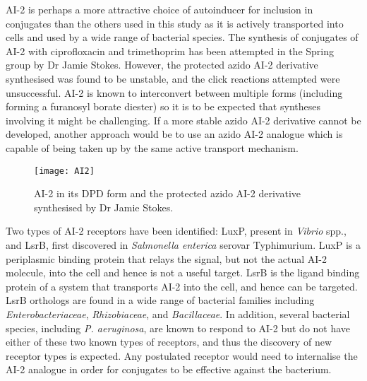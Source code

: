 
AI-2  is perhaps a more attractive choice of autoinducer for inclusion in conjugates than the others used in this study as it is actively transported into cells\cite{Taga2003} and used by a wide range of bacterial species\cite{Pereira2013}.
The synthesis of conjugates of AI-2  with ciprofloxacin  and trimethoprim  has been attempted in the Spring group by Dr Jamie Stokes. However, the protected azido AI-2 derivative  synthesised was found to be unstable, and the click reactions attempted were unsuccessful\cite{Stokes2017}. AI-2  is known to interconvert between multiple forms (including forming a furanosyl borate diester)\cite{Guo2015} so it is to be expected that syntheses involving it might be challenging. If a more stable azido AI-2 derivative cannot be developed, another approach would be to use an azido AI-2  analogue which is capable of being taken up by the same active transport mechanism. 

\begin{figure}[H]
	\begin{center}
		\texttt{[image: AI2]}
		\caption{AI-2  in its DPD form and the protected azido AI-2 derivative  synthesised by Dr Jamie Stokes\cite{Stokes2017}.
		\label{fgr:AI2}} 
	\end{center}
\end{figure}

Two types of AI-2  receptors have been identified: LuxP, present in \textit{Vibrio} spp.\cite{Chen2002}, and LsrB, first discovered in \textit{Salmonella enterica} serovar Typhimurium\cite{Miller2004}. 
LuxP is a periplasmic binding protein that relays the signal, but not the actual AI-2  molecule, into the cell and hence is not a useful target.\cite{Neiditch2005}
LsrB is the ligand binding protein of a system that transports AI-2  into the cell\cite{Taga2003}, and hence can be targeted. LsrB orthologs are found in a wide range of bacterial families including \textit{Enterobacteriaceae}, \textit{Rhizobiaceae}, and \textit{Bacillaceae}\cite{Pereira2009}.
In addition, several bacterial species, including \textit{P. aeruginosa}, are known to respond to AI-2  but do not have either of these two known types of receptors, and thus the discovery of new receptor types is expected\cite{Pereira2009}. Any postulated receptor would need to internalise the AI-2 analogue in order for conjugates to be effective against the bacterium.

